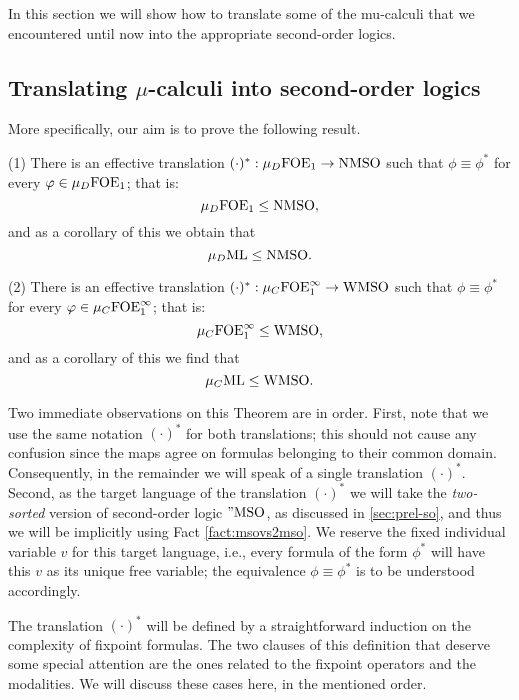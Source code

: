 
In this section we will show how to translate some of the mu-calculi that we
encountered until now into the appropriate second-order logics.

\subsection{Translating $\mu$-calculi into second-order logics}

More specifically, our aim is to prove the following result.

\begin{theorem}
\label{t:mfl2mso}
(1) There is an effective translation $(\cdot)^{*}: \mu_{D}\mathrm{FOE}_1 \to \mathrm{NMSO}$
such that $\phi \equiv \phi^{*}$ for every $\varphi \in \mu_{D}\mathrm{FOE}_1$; that is:
\[
\mu_{D}\mathrm{FOE}_1 \leq \mathrm{NMSO},
\]
and as a corollary of this we obtain that 
\[
\mu_{D}\mathrm{ML} \leq \mathrm{NMSO}.
\]

(2) There is an effective translation $(\cdot)^{*}: \mu_{C}\mathrm{FOE}^{\infty}_1 \to \mathrm{WMSO}$
such that $\phi \equiv \phi^{*}$ for every $\varphi \in \mu_{C}\mathrm{FOE}^{\infty}_1$; that is:
\[
\mu_{C}\mathrm{FOE}^{\infty}_1 \leq \mathrm{WMSO},
\]
and as a corollary of this we find that 
\[
\mu_{C}\mathrm{ML} \leq \mathrm{WMSO}.
\]
\end{theorem}

Two immediate observations on this Theorem are in order.
First, note that we use the same notation $(\cdot)^{*}$ for both translations; 
this should not cause any confusion since the maps agree on formulas belonging 
to their common domain.
Consequently, in the remainder we will speak of a single translation 
$(\cdot)^{*}$.
Second, as the target language of the translation $(\cdot)^{*}$ we will take 
the \emph{two-sorted} version of second-order logic $"\mathrm{MSO}$, as discussed in 
\ref{sec:prel-so}, and thus we will be implicitly using Fact \ref{fact:msovs2mso}.
We reserve the fixed individual variable $v$ for this target language, i.e., 
every formula of the form $\phi^{*}$ will have this $v$ as its unique free 
variable; the equivalence $\phi \equiv \phi^{*}$ is to be understood accordingly.

The translation $(\cdot)^{*}$ will be defined by a straightforward induction on
the complexity of fixpoint formulas.
The two clauses of this definition that deserve some special attention are the
ones related to the fixpoint operators and the modalities.
We will discuss these cases here, in the mentioned order.

